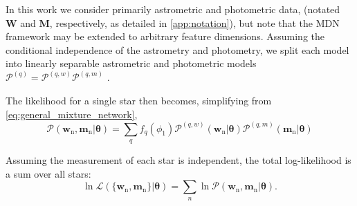 \documentclass[twocolumn]{aastex631}
\newcommand{\mrm}[1]{\mathrm{#1}}
\newcommand{\mbs}[1]{\boldsymbol{#1}}
\newcommand{\mcal}[1]{\mathcal{#1}}
\newcommand{\pdf}{\mcal{P}}
\newcommand{\nth}[1]{{#1}_{\mrm{n}}}  %
\newcommand{\smallcomponent}[2]{#2^{\scriptscriptstyle (#1)}}
\newcommand{\cmp}[2]{\smallcomponent{#1}{#2}}
\begin{document}
        In this work we consider primarily astrometric and photometric data,
        (notated $\mbs{W}$ and $\mbs{M}$, respectively, as detailed in
        \autoref{app:notation}), but note that the MDN framework may be extended
        to arbitrary feature dimensions.  Assuming the conditional independence
        of the astrometry and photometry, we split each model into linearly
        separable astrometric and photometric models $\cmp{q}{\pdf} =
        \cmp{q,w}{\pdf} \cmp{q,m}{\pdf}$ .

        The likelihood for a single star then becomes, simplifying from
        \autoref{eq:general_mixture_network},
        \begin{equation} \label{eq:general_model}
            \!\!\!\!\! \pdf(\nth{\mbs{w}}, \! \nth{\mbs{m}} | \mbs{\theta})
                \!=\! \sum_{q} \! f_q(\phi_1) \cmp{q,w}{\pdf}(\nth{\mbs{w}}|\mbs{\theta}) \cmp{q,m}{\pdf}(\nth{\mbs{m}}|\mbs{\theta})
        \end{equation}

        Assuming the measurement of each star is independent, the total
        log-likelihood is a sum over all stars:
        \begin{equation} \label{eq:general_likelihood}
            \ln\mcal{L}\left(\{\nth{\mbs{w}},\nth{\mbs{m}}\} | \mbs{\theta}\right) = \sum_n \ln \pdf(\nth{\mbs{w}}, \nth{\mbs{m}} | \mbs{\theta}).
        \end{equation}
\end{document}
